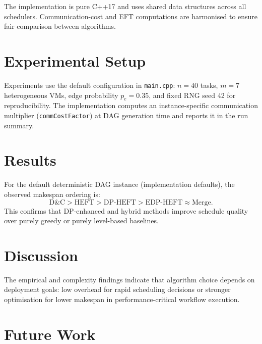 \documentclass[conference]{IEEEtran}
\begin{document}
The implementation is pure C++17 and uses shared data structures across
all schedulers. Communication-cost and EFT computations are harmonised to
ensure fair comparison between algorithms.

\section{Experimental Setup}
\label{sec:setup}

Experiments use the default configuration in \texttt{main.cpp}:
$n=40$ tasks, $m=7$ heterogeneous VMs, edge probability $p_e=0.35$,
and fixed RNG seed 42 for reproducibility. The implementation computes
an instance-specific communication multiplier (\texttt{commCostFactor})
at DAG generation time and reports it in the run summary.

\section{Results}
\label{sec:results}

For the default deterministic DAG instance (implementation defaults), the observed makespan
ordering is:
\[
\text{D\&C} > \text{HEFT} > \text{DP-HEFT} > \text{EDP-HEFT} \approx \text{Merge}.
\]
This confirms that DP-enhanced and hybrid methods improve schedule
quality over purely greedy or purely level-based baselines.

\section{Discussion}
\label{sec:discussion}

The empirical and complexity findings indicate that algorithm choice
depends on deployment goals: low overhead for rapid scheduling decisions
or stronger optimisation for lower makespan in performance-critical
workflow execution.

\section{Future Work}
\label{sec:future}
\end{document}
